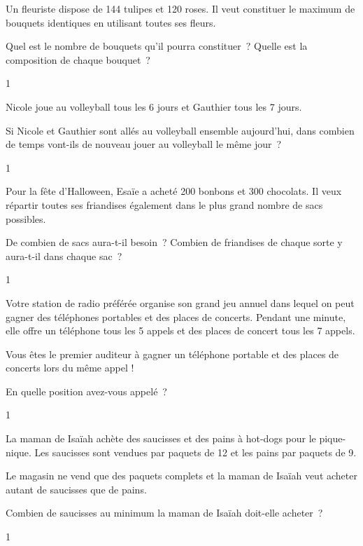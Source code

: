 \documentclass[a4paper,11pt]{report}
\begin{document}
\begin{exo}{ %
    Un fleuriste dispose de 144 tulipes et 120 roses. Il veut constituer le maximum de bouquets identiques en utilisant toutes ses fleurs.
    \begin{tasks}
        \task Quel est le nombre de bouquets qu'il pourra constituer~?
        \task Quelle est la composition de chaque bouquet~?
    \end{tasks}
}{1}\end{exo}






\begin{exo}{ %
    Nicole joue au volleyball tous les 6 jours et Gauthier tous les 7 jours. 

    Si Nicole et Gauthier sont allés au volleyball ensemble aujourd'hui, dans combien de temps vont-ils de nouveau jouer au volleyball le même jour~? 
}{1}\end{exo}




\begin{exo}{ %
    Pour la fête d'Halloween, Esaïe a acheté 200 bonbons et 300 chocolats. Il veux répartir toutes ses friandises également dans le plus grand nombre de sacs possibles.
    \begin{tasks}
        \task De combien de sacs aura-t-il besoin~?
        \task Combien de friandises de chaque sorte y aura-t-il dans chaque sac~?
    \end{tasks}
}{1}\end{exo}

\begin{exo}{ %
    Votre station de radio préférée organise son grand jeu annuel dans lequel on peut gagner des téléphones portables et des places de concerts. Pendant une minute, elle offre un téléphone tous les 5 appels et des places de concert tous les 7 appels. 

    Vous êtes le premier auditeur à gagner un téléphone portable et des places de concerts lors du même appel ! 

    En quelle position avez-vous appelé~? 
}{1}\end{exo}








\begin{exo}{ %
    La maman de Isaïah achète des saucisses et des pains à hot-dogs pour le pique-nique. Les saucisses sont vendues par paquets de 12 et les pains par paquets de 9.

    Le magasin ne vend que des paquets complets et la maman de Isaïah veut acheter autant de saucisses que de pains.

    Combien de saucisses au minimum la maman de Isaïah doit-elle acheter~? 
}{1}\end{exo}
\end{document}
